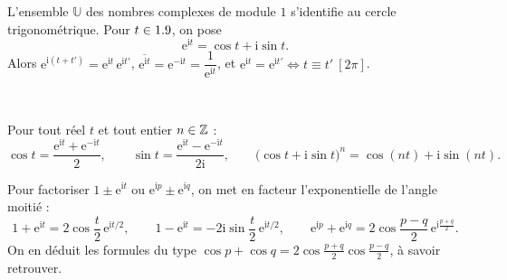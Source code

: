 \noindent
\begin{minipage}[c]{0.6\linewidth}
\begin{definition}
L'ensemble $\mathbb{U}$ des nombres complexes de module $1$ s'identifie au
cercle trigonométrique. Pour $t\in1.9$, on pose
\[
  \mathrm{e}^{\mathrm{i}t}=\cos t+\mathrm{i}\sin t.
\]
Alors $\mathrm{e}^{\mathrm{i}(t+t')}=\mathrm{e}^{\mathrm{i}t}\,\mathrm{e}^{\mathrm{i}t'}$,
$\overline{\mathrm{e}^{\mathrm{i}t}}=\mathrm{e}^{-\mathrm{i}t}=\dfrac{1}{\mathrm{e}^{\mathrm{i}t}}$,
et $\mathrm{e}^{\mathrm{i}t}=\mathrm{e}^{\mathrm{i}t'}\iff t\equiv t'\ [2\pi]$.
\end{definition}
\end{minipage}\hfill
\begin{minipage}[c]{0.36\linewidth}
\centering
{}\\[0.5mm]
\end{minipage}

\begin{theoreme}
Pour tout réel $t$ et tout entier $n\in\mathbb{Z}$ :
\[
  \cos t=\frac{\mathrm{e}^{\mathrm{i}t}+\mathrm{e}^{-\mathrm{i}t}}{2},\qquad
  \sin t=\frac{\mathrm{e}^{\mathrm{i}t}-\mathrm{e}^{-\mathrm{i}t}}{2\mathrm{i}},\qquad
  \bigl(\cos t+\mathrm{i}\sin t\bigr)^{n}=\cos(nt)+\mathrm{i}\sin(nt).
\]
\end{theoreme}

\begin{savoirfaire}
Pour factoriser $1\pm\mathrm{e}^{\mathrm{i}t}$ ou
$\mathrm{e}^{\mathrm{i}p}\pm\mathrm{e}^{\mathrm{i}q}$, on met en facteur
l'exponentielle de l'angle moitié :
\[
  1+\mathrm{e}^{\mathrm{i}t}=2\cos\frac{t}{2}\,\mathrm{e}^{\mathrm{i}t/2},\qquad
  1-\mathrm{e}^{\mathrm{i}t}=-2\mathrm{i}\sin\frac{t}{2}\,\mathrm{e}^{\mathrm{i}t/2},\qquad
  \mathrm{e}^{\mathrm{i}p}+\mathrm{e}^{\mathrm{i}q}=2\cos\frac{p-q}{2}\,\mathrm{e}^{\mathrm{i}\frac{p+q}{2}}.
\]
On en déduit les formules du type
$\cos p+\cos q=2\cos\frac{p+q}{2}\cos\frac{p-q}{2}$, à savoir retrouver.
\end{savoirfaire}

